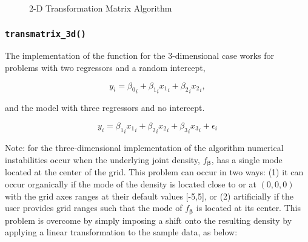 \documentclass[a4paper,12pt]{article}
\newcommand{\bbeta}{{\boldsymbol{\beta}}}
\begin{document}
\begin{figure}[!htb]
\caption{2-D Transformation Matrix Algorithm} \label{fig:1d_Algo}
\end{figure}

\subsubsection{\texttt{transmatrix\_3d()}}

The implementation of the function for the 3-dimensional case works for problems with two regressors and a random intercept,


\begin{equation}
	y_i={\beta_0}_i+{\beta_1}_{i}{x_1}_i+{\beta_2}_{i}{x_2}_i,
	\label{eqn:rc_model_3d}
\end{equation}

and the model with three regressors and no intercept.

\begin{equation}
	y_i={\beta_1}_{i}{x_1}_i+{\beta_2}_{i}{x_2}_i+{\beta_3}_{i}{x_3}_i + \epsilon_i
	\label{eqn:rc_model_3d_no_intercept}
\end{equation}

Note: for the three-dimensional implementation of the algorithm numerical instabilities occur when the underlying joint density, $f_\bbeta$, has a single mode located at the center of the grid. This problem can occur in two ways: (1) it can occur organically if the mode of the density is located close to or at $(0,0,0)$ with the grid axes ranges at their default values [-5,5], or (2) artificially if the user provides grid ranges such that the mode of $f_\bbeta$ is located at its center.
This problem is overcome by simply imposing a shift onto the resulting density by applying a linear transformation to the sample data, as below:
\end{document}
